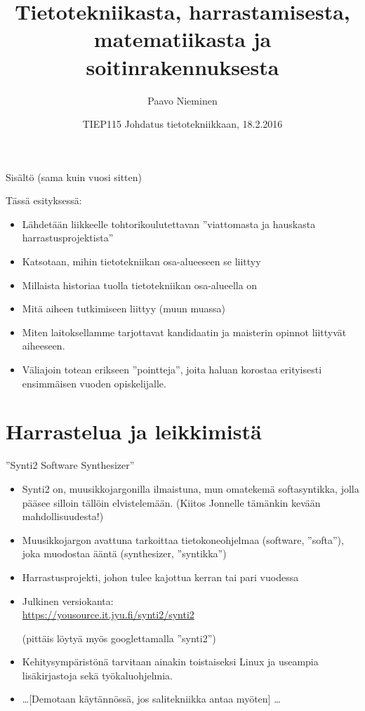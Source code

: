 \documentclass[pdf,10pt,handout]{beamer}
\title[TIEP115]
{Tietotekniikasta, harrastamisesta, matematiikasta ja soitinrakennuksesta}
\author{Paavo Nieminen}
\date{TIEP115 Johdatus tietotekniikkaan, 18.2.2016}
\begin{document}
\begin{frame}
  \titlepage
\end{frame}

\begin{frame}{Sisältö (sama kuin vuosi sitten)}

{
\setlength{\parskip}{\smallskipamount}
  \tableofcontents
}
\end{frame}
\beamerdefaultoverlayspecification{<+->}

\begin{frame}{Tässä esityksessä:}
  \begin{itemize}
  \item Lähdetään liikkeelle tohtorikoulutettavan ''viattomasta ja
    hauskasta harrastusprojektista''
  \item Katsotaan, mihin tietotekniikan osa-alueeseen se liittyy
  \item Millaista historiaa tuolla tietotekniikan osa-alueella on
  \item Mitä aiheen tutkimiseen liittyy (muun muassa)
  \item Miten laitoksellamme tarjottavat kandidaatin ja maisterin
    opinnot liittyvät aiheeseen.
  \item Väliajoin totean erikseen ''pointteja'', joita haluan korostaa
    erityisesti ensimmäisen vuoden opiskelijalle.
  \end{itemize}
\end{frame}


\section{Harrastelua ja leikkimistä}
\begin{frame}{''Synti2 Software Synthesizer''}
\begin{itemize}
  \item Synti2 on, muusikkojargonilla ilmaistuna, mun omatekemä
    softasyntikka, jolla pääsee silloin tällöin elvistelemään. (Kiitos
    Jonnelle tämänkin kevään mahdollisuudesta!)
  \item Muusikkojargon avattuna tarkoittaa tietokoneohjelmaa
    (software, ''softa''), joka muodostaa ääntä (synthesizer,
    ''syntikka'')
  \item Harrastusprojekti, johon tulee kajottua kerran tai pari vuodessa
  \item Julkinen versiokanta:\\ \small{\url{https://yousource.it.jyu.fi/synti2/synti2}}

    (pittäis löytyä myös googlettamalla ''synti2'')

  \item Kehitysympäristönä tarvitaan ainakin toistaiseksi Linux ja
    useampia lisäkirjastoja sekä työkaluohjelmia.
    
  \item \ldots [Demotaan käytännössä, jos salitekniikka antaa myöten]
    \ldots

\end{itemize}
\end{frame}
\end{document}
